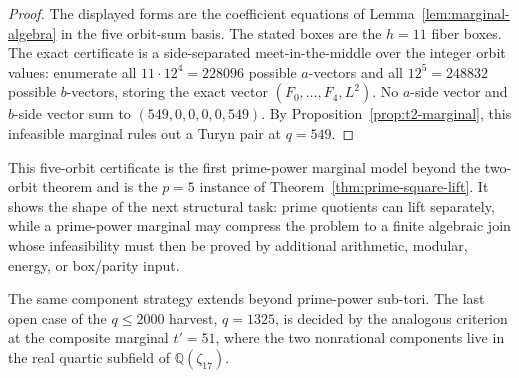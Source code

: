 \documentclass[11pt]{article}
\theoremstyle{plain}
\theoremstyle{definition}
\theoremstyle{remark}
\newcommand{\Q}{\mathbb Q}
\begin{document}
\begin{proof}
The displayed forms are the coefficient equations of
Lemma~\ref{lem:marginal-algebra} in the five orbit-sum basis. The stated boxes
are the $h=11$ fiber boxes. The exact certificate is a side-separated
meet-in-the-middle over the integer orbit values: enumerate all
$11\cdot12^4=228096$ possible $a$-vectors and all $12^5=248832$ possible
$b$-vectors, storing the exact vector $(F_0,\ldots,F_4,L^2)$. No $a$-side vector
and $b$-side vector sum to $(549,0,0,0,0,549)$. By
Proposition~\ref{prop:t2-marginal}, this infeasible marginal rules out a Turyn
pair at $q=549$.
\end{proof}

This five-orbit certificate is the first prime-power marginal model beyond the
two-orbit theorem and is the $p=5$ instance of
Theorem~\ref{thm:prime-square-lift}. It shows the shape of the next structural
task: prime quotients can lift separately, while a prime-power marginal may
compress the problem to a finite algebraic join whose infeasibility must then be
proved by additional arithmetic, modular, energy, or box/parity input.

The same component strategy extends beyond prime-power sub-tori. The last open
case of the $q\le2000$ harvest, $q=1325$, is decided by the analogous criterion
at the composite marginal $t'=51$, where the two nonrational components live in
the real quartic subfield of $\Q(\zeta_{17})$.
\end{document}
